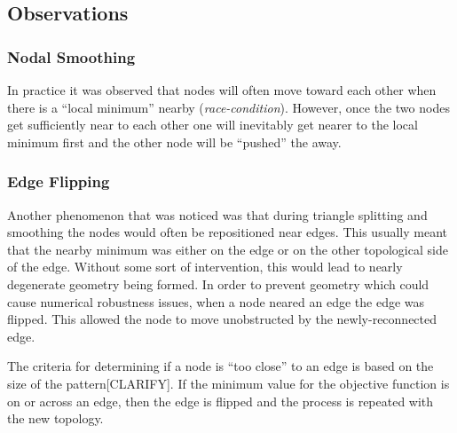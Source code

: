 \subsection{Observations}
\subsubsection{Nodal Smoothing}
In practice it was observed that nodes will often move toward each other
when there is a ``local minimum'' nearby ({\it race-condition}).
However, once the two nodes get sufficiently near to each other one will
inevitably get nearer to the local minimum first and the other node will
be ``pushed'' the away.

\subsubsection{Edge Flipping}
Another phenomenon that was noticed was that during triangle splitting
and smoothing the nodes would often be repositioned near edges. This
usually meant that the nearby minimum was either on the edge or on the
other topological side of the edge. Without some sort of intervention,
this would lead to nearly degenerate geometry being formed. In order to
prevent geometry which could cause numerical robustness issues, when a
node neared an edge the edge was flipped. This allowed the node to move
unobstructed by the newly-reconnected edge.

The criteria for determining if a node is ``too close'' to an edge is
based on the size of the pattern[CLARIFY]. If the minimum value for the
objective function is on or across an edge, then the edge is flipped and
the process is repeated with the new topology.

